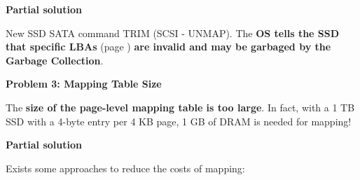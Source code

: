 \highspace
\begin{flushleft}
    \textcolor{Green3}{ \textbf{Partial solution}}
\end{flushleft}
New SSD SATA command TRIM (SCSI - UNMAP). The \textbf{OS tells the SSD that specific LBAs} (page \pageref{LBA (Logical Block Address)}) \textbf{are invalid and may be garbaged by the Garbage Collection}.

\highspace
\begin{flushleft}
    \textcolor{Red2}{ \textbf{Problem 3: Mapping Table Size}}
\end{flushleft}
The \textbf{size of the page-level mapping table is too large}. In fact, with a 1 TB SSD with a 4-byte entry per 4 KB page, 1 GB of DRAM is needed for mapping!

\highspace
\begin{flushleft}
    \textcolor{Green3}{ \textbf{Partial solution}}
\end{flushleft}
Exists some approaches to reduce the costs of mapping:
